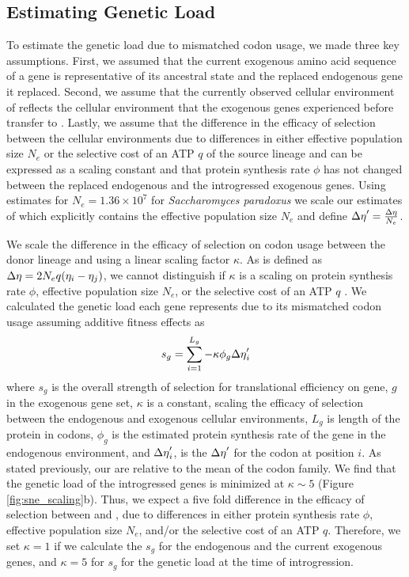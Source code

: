 \documentclass[fleqn,letterpaper]{article}
\begin{document}
\subsection*{Estimating Genetic Load}

To estimate the genetic load due to mismatched codon usage, we made three key assumptions.
First, we assumed that the current exogenous amino acid sequence of a gene is representative of its ancestral state and the replaced endogenous gene it replaced.
Second, we assume that the currently observed cellular environment of \gossypii reflects the cellular environment that the exogenous genes experienced before transfer to \kluyveri.
Lastly, we assume that the difference in the efficacy of selection between the cellular environments due to differences in either effective population size $N_e$ or the selective cost of an ATP $q$ of the source lineage and \kluyveri can be expressed as a scaling constant and that protein synthesis rate $\phi$ has not changed between the replaced endogenous and the introgressed exogenous genes.
Using estimates for $N_e = 1.36\times10^7$ \citep{wagner2005} for \textit{Saccharomyces paradoxus} we scale our estimates of \DE which explicitly contains the effective population size $N_e$ \citep{gilchrist2015} and define ${\Delta \eta}' = \frac{{\Delta \eta}}{N_e}$.

We scale the difference in the efficacy of selection on codon usage between the donor lineage and \kluyveri using a linear scaling factor $\kappa$.
As \DE is defined as ${\Delta \eta} = 2N_eq(\eta_i-\eta_j)$, we cannot distinguish if $\kappa$ is a scaling on protein synthesis rate $\phi$, effective population size $N_e$, or the selective cost of an ATP $q$ \citep{gilchrist2007, gilchrist2015}.
We calculated the genetic load each gene represents due to its mismatched codon usage assuming additive fitness effects as 
\begin{equation}
s_g = \sum_{i=1}^{L_g} -\kappa \phi_g {\Delta \eta}'_i
\label{equ:sg}
\end{equation}
where $s_g$ is the overall strength of selection for translational efficiency on gene, $g$  in the exogenous gene set, $\kappa$ is a constant, scaling the efficacy of selection between the endogenous and exogenous cellular environments, $L_{g}$ is length of the protein in codons, $\phi_g$ is the estimated protein synthesis rate of the gene in the endogenous environment, and ${\Delta \eta}'_i$, is the ${\Delta \eta}'$ for the codon at position $i$.
As stated previously, our \DE are relative to the mean of the codon family.
We find that the genetic load of the introgressed genes is minimized at $\kappa \sim 5$ (Figure \ref{fig:sne_scaling}b).
Thus, we expect a five fold difference in the efficacy of selection between \kluyveri and \gossypii, due to differences in either protein synthesis rate $\phi$, effective population size $N_e$, and/or the selective cost of an ATP $q$.
Therefore, we set $\kappa = 1$ if we calculate the $s_g$ for the endogenous and the current exogenous genes, and $\kappa = 5$ for $s_g$ for the genetic load at the time of introgression.
\end{document}
